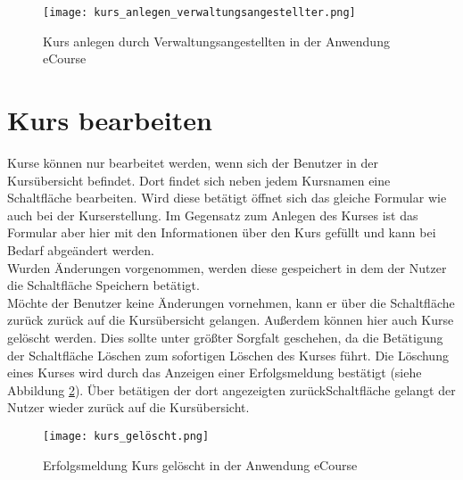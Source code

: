 \begin{figure}[h]
\centering
\texttt{[image: kurs\_anlegen\_verwaltungsangestellter.png]}
\caption{Kurs anlegen durch Verwaltungsangestellten in der Anwendung eCourse}
\label{fib:ke}
\end{figure}


\section{Kurs bearbeiten}
Kurse können nur bearbeitet werden, wenn sich der Benutzer in der Kursübersicht befindet. Dort findet sich neben jedem Kursnamen eine Schaltfläche \glqq bearbeiten\grqq . Wird diese betätigt öffnet sich das gleiche Formular wie auch bei der Kurserstellung. Im Gegensatz zum Anlegen des Kurses ist das Formular aber hier mit den Informationen über den Kurs gefüllt und kann bei Bedarf abgeändert werden.\\
Wurden Änderungen vorgenommen, werden diese gespeichert in dem der Nutzer die Schaltfläche \glqq Speichern\grqq\: betätigt.\\
Möchte der Benutzer keine Änderungen vornehmen, kann er über die Schaltfläche \glqq zurück\grqq\: zurück auf die Kursübersicht gelangen.
Außerdem können hier auch Kurse gelöscht werden. Dies sollte unter größter Sorgfalt geschehen, da die Betätigung der Schaltfläche \glqq Löschen\grqq\: zum sofortigen Löschen des Kurses führt. Die Löschung eines Kurses wird durch das Anzeigen einer Erfolgsmeldung bestätigt (siehe Abbildung \ref{fib:kl}). Über betätigen der dort angezeigten \glqq zurück\grqq Schaltfläche gelangt der Nutzer wieder zurück auf die Kursübersicht.

\begin{figure}[h]
\centering
\texttt{[image: kurs\_gelöscht.png]}
\caption{Erfolgsmeldung Kurs gelöscht in der Anwendung eCourse}
\label{fib:kl}
\end{figure}

